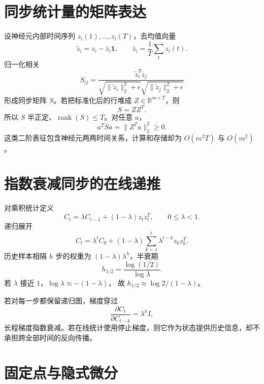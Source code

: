 \documentclass[11pt]{article}
\numberwithin{equation}{section}
\newcommand{\R}{\mathbb{R}}
\newcommand{\1}{\mathbf{1}}
\begin{document}
\section{同步统计量的矩阵表达}

设神经元内部时间序列 $z_i(1),\ldots,z_i(T)$，去均值向量
\begin{equation}
 \widetilde z_i=z_i-\bar z_i\1,\qquad
 \bar z_i=\frac1T\sum_tz_i(t).
\end{equation}
归一化相关
\begin{equation}
 S_{ij}=\frac{\widetilde z_i^T\widetilde z_j}
 {\sqrt{\|\widetilde z_i\|_2^2+\epsilon}
  \sqrt{\|\widetilde z_j\|_2^2+\epsilon}}
\end{equation}
形成同步矩阵 $S$。若把标准化后的行堆成 $Z\in\R^{m\times T}$，则
\begin{equation}
 S=ZZ^T.
\end{equation}
所以 $S$ 半正定、$\operatorname{rank}(S)\le T$。对任意 $a$，
\begin{equation}
 a^TSa=\|Z^Ta\|_2^2\ge0.
\end{equation}
这类二阶表征包含神经元两两时间关系，计算和存储却为 $O(m^2T)$ 与 $O(m^2)$。

\section{指数衰减同步的在线递推}

对乘积统计定义
\begin{equation}
 C_t=\lambda C_{t-1}+(1-\lambda)z_tz_t^T,
 \qquad0\le\lambda<1.
\end{equation}
递归展开
\begin{equation}
 C_t=\lambda^tC_0+(1-\lambda)
 \sum_{k=1}^{t}\lambda^{t-k}z_kz_k^T.
\end{equation}
历史样本相隔 $h$ 步的权重为 $(1-\lambda)\lambda^h$，半衰期
\begin{equation}
 h_{1/2}=\frac{\log(1/2)}{\log\lambda}.
\end{equation}
若 $\lambda$ 接近 $1$，$\log\lambda\approx-(1-\lambda)$，
故 $h_{1/2}\approx\log2/(1-\lambda)$。

若对每一步都保留递归图，梯度穿过
\begin{equation}
 \frac{\partial C_t}{\partial C_{t-k}}=\lambda^kI,
\end{equation}
长程梯度指数衰减。若在线统计使用停止梯度，则它作为状态提供历史信息，却不承担跨全部时间的反向传播。

\section{固定点与隐式微分}
\end{document}
